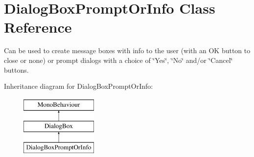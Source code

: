 \hypertarget{class_dialog_box_prompt_or_info}{}\section{Dialog\+Box\+Prompt\+Or\+Info Class Reference}
\label{class_dialog_box_prompt_or_info}


Can be used to create message boxes with info to the user (with an OK button to close or none) or prompt dialogs with a choice of \char`\"{}\+Yes\char`\"{}, \char`\"{}\+No\char`\"{} and/or \char`\"{}\+Cancel\char`\"{} buttons.  


Inheritance diagram for Dialog\+Box\+Prompt\+Or\+Info\+:\begin{figure}[H]
\begin{center}
\leavevmode
\includegraphics[height=3.000000cm]{class_dialog_box_prompt_or_info}
\end{center}
\end{figure}
